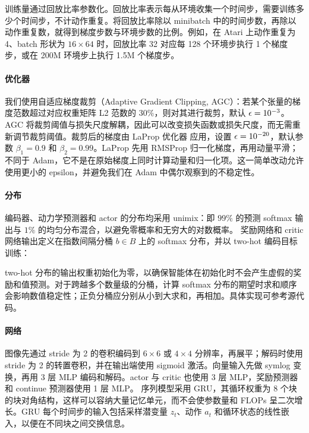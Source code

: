 训练量通过回放比率参数化。回放比率表示每从环境收集一个时间步，需要训练多少个时间步，不计动作重复。将回放比率除以 minibatch 中的时间步数，再除以动作重复数，就得到梯度步数与环境步数的比例。例如，在 Atari 上动作重复为 4、batch 形状为 $16 \times 64$ 时，回放比率 32 对应每 128 个环境步执行 1 个梯度步，或在 200M 环境步上执行 1.5M 个梯度步。

\paragraph{优化器}
我们使用自适应梯度裁剪（Adaptive Gradient Clipping, AGC）\citep{brock2021agc}：若某个张量的梯度范数超过对应权重矩阵 L2 范数的 $30\%$，则对其进行裁剪，默认 $\epsilon=10^{-3}$。AGC 将裁剪阈值与损失尺度解耦，因此可以改变损失函数或损失尺度，而无需重新调节裁剪阈值。裁剪后的梯度由 LaProp 优化器\citep{ziyin2020laprop} 应用，设置 $\epsilon=10^{-20}$，默认参数 $\beta_1=0.9$ 和 $\beta_2=0.99$。LaProp 先用 RMSProp 归一化梯度，再用动量平滑；不同于 Adam，它不是在原始梯度上同时计算动量和归一化项\citep{kingma2014adam}。这一简单改动允许使用更小的 epsilon，并避免我们在 Adam 中偶尔观察到的不稳定性。

\paragraph{分布}
编码器、动力学预测器和 actor 的分布均采用 unimix：即 $99\%$ 的预测 softmax 输出与 $1\%$ 的均匀分布混合\citep{gruslys2017reactor}，以避免零概率和无穷大的对数概率。
奖励网络和 critic 网络输出定义在指数间隔分桶 $b \in B$ 上的 softmax 分布，并以 two-hot 编码目标训练：


two-hot 分布的输出权重初始化为零，以确保智能体在初始化时不会产生虚假的奖励和值预测。对于跨越多个数量级的分桶，计算 softmax 分布的期望时求和顺序会影响数值稳定性；正负分桶应分别从小到大求和，再相加。具体实现可参考源代码。

\paragraph{网络}
图像先通过 stride 为 2 的卷积编码到 $6 \times 6$ 或 $4 \times 4$ 分辨率，再展平；解码时使用 stride 为 2 的转置卷积，并在输出端使用 sigmoid 激活。向量输入先做 symlog 变换，再用 3 层 MLP 编码和解码。actor 与 critic 也使用 3 层 MLP，奖励预测器和 continue 预测器使用 1 层 MLP。
序列模型采用 GRU\citep{cho2014gru}，其循环权重为 8 个块的块对角结构\citep{van2019blockrnn}，这样可以容纳大量记忆单元，而不会使参数量和 FLOPs 呈二次增长。GRU 每个时间步的输入包括采样潜变量 $z_t$、动作 $a_t$ 和循环状态的线性嵌入，以便在不同块之间交换信息。

